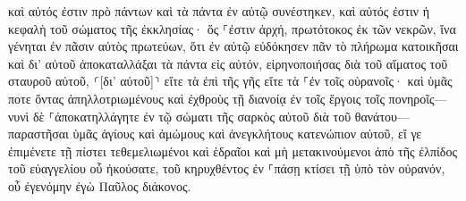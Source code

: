 \documentclass{openreader}
\begin{document}
καὶ αὐτός ἐστιν πρὸ πάντων καὶ τὰ πάντα ἐν αὐτῷ συνέστηκεν, 
καὶ αὐτός ἐστιν ἡ κεφαλὴ τοῦ σώματος τῆς ἐκκλησίας· ὅς ⸀ἐστιν ἀρχή, πρωτότοκος ἐκ τῶν νεκρῶν, ἵνα γένηται ἐν πᾶσιν αὐτὸς πρωτεύων, 
ὅτι ἐν αὐτῷ εὐδόκησεν πᾶν τὸ πλήρωμα κατοικῆσαι 
καὶ δι’ αὐτοῦ ἀποκαταλλάξαι τὰ πάντα εἰς αὐτόν, εἰρηνοποιήσας διὰ τοῦ αἵματος τοῦ σταυροῦ αὐτοῦ, ⸂[δι’ αὐτοῦ]⸃ εἴτε τὰ ἐπὶ τῆς γῆς εἴτε τὰ ⸀ἐν τοῖς οὐρανοῖς· 
καὶ ὑμᾶς ποτε ὄντας ἀπηλλοτριωμένους καὶ ἐχθροὺς τῇ διανοίᾳ ἐν τοῖς ἔργοις τοῖς πονηροῖς— 
νυνὶ δὲ ⸀ἀποκατηλλάγητε ἐν τῷ σώματι τῆς σαρκὸς αὐτοῦ διὰ τοῦ θανάτου— παραστῆσαι ὑμᾶς ἁγίους καὶ ἀμώμους καὶ ἀνεγκλήτους κατενώπιον αὐτοῦ, 
εἴ γε ἐπιμένετε τῇ πίστει τεθεμελιωμένοι καὶ ἑδραῖοι καὶ μὴ μετακινούμενοι ἀπὸ τῆς ἐλπίδος τοῦ εὐαγγελίου οὗ ἠκούσατε, τοῦ κηρυχθέντος ἐν ⸀πάσῃ κτίσει τῇ ὑπὸ τὸν οὐρανόν, οὗ ἐγενόμην ἐγὼ Παῦλος διάκονος. 
\end{document}
